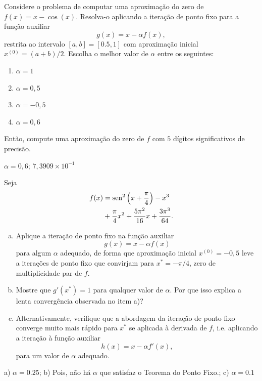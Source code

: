 \begin{exer}
  Considere o problema de computar uma aproximação do zero de $f(x)=x-\cos(x)$. Resolva-o aplicando a iteração de ponto fixo para a função auxiliar
  \begin{equation}
    g(x) = x - \alpha f(x),
  \end{equation}
restrita ao intervalo $[a, b] = [0.5, 1]$ com aproximação inicial $x^{(0)}=(a+b)/2$. Escolha o melhor valor de $\alpha$ entre os seguintes:
\begin{enumerate}
\item $\alpha = 1$
\item $\alpha = 0,5$
\item $\alpha = -0,5$
\item $\alpha = 0,6$
\end{enumerate}
Então, compute uma aproximação do zero de $f$ com $5$ dígitos significativos de precisão.
\end{exer}
\begin{resp}
  $\alpha=0,6$; $7,3909\times 10^{-1}$
\end{resp}

\begin{exer}
  Seja
  \begin{equation}
    \begin{aligned}
      f(x) &= \operatorname{sen}^2\left(x+\frac{\pi}{4}\right) - x^3\\
      &+ \frac{\pi}{4}x^2 + \frac{5\pi^2}{16}x + \frac{3\pi^3}{64}.
    \end{aligned}
\end{equation}
  \begin{enumerate}[a)]
  \item Aplique a iteração de ponto fixo na função auxiliar
    \begin{equation}
      g(x) = x - \alpha f(x)
    \end{equation}
    para algum $\alpha$ adequado, de forma que aproximação inicial $x^{(0)}=-0,5$ leve a iterações de ponto fixo que convirjam para $x^*=-\pi/4$, zero de multiplicidade par de $f$.
  \item Mostre que $g'(x^*) = 1$ para qualquer valor de $\alpha$. Por que isso explica a lenta convergência observada no item a)?
  \item Alternativamente, verifique que a abordagem da iteração de ponto fixo converge muito mais rápido para $x^*$ se aplicada à derivada de $f$, i.e. aplicando a iteração à função auxiliar
    \begin{equation}
      h(x) = x - \alpha f'(x),
    \end{equation}
    para um valor de $\alpha$ adequado.
  \end{enumerate}
\end{exer}
\begin{resp}
  a) $\alpha = 0.25$; b) Pois, não há $\alpha$ que satisfaz o Teorema do Ponto Fixo.; c) $\alpha = 0.1$
\end{resp}

